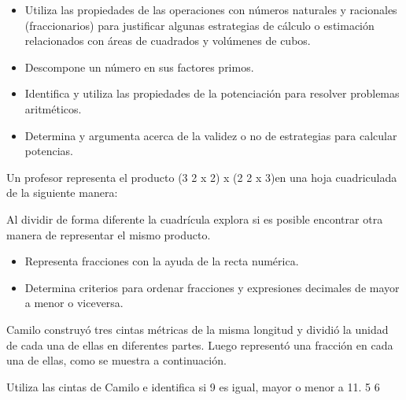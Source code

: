 \begin{itemize}
  \item Utiliza las propiedades de las operaciones con números naturales y racionales (fraccionarios) para justificar algunas estrategias de cálculo o estimación relacionados con áreas de cuadrados y volúmenes de cubos.
  \item Descompone un número en sus factores primos.
  \item Identifica y utiliza las propiedades de la potenciación para resolver problemas aritméticos.
  \item Determina y argumenta acerca de la validez o no de estrategias para calcular potencias.
\end{itemize}

\ejemplo

Un profesor representa el producto (3 2 x 2) x (2 2 x 3)en una hoja cuadriculada de la siguiente manera:


Al dividir de forma diferente la cuadrícula explora si es posible encontrar otra manera de representar el mismo producto.



\evidencias

\begin{itemize}
  \item Representa fracciones con la ayuda de la recta numérica.
  \item Determina criterios para ordenar fracciones y expresiones decimales de mayor a menor o viceversa.
\end{itemize}

\ejemplo

Camilo construyó tres cintas métricas de la misma longitud y dividió la unidad de cada una de ellas en diferentes partes. Luego representó una fracción en cada una de ellas, como se muestra a continuación.




Utiliza las cintas de Camilo e identifica si 9 es igual, mayor o menor a 11. 5			 6



